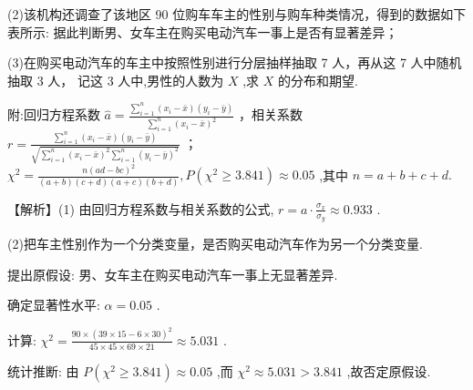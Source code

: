 \documentclass[10pt]{article}
\begin{document}
(2)该机构还调查了该地区 90 位购车车主的性别与购车种类情况，得到的数据如下表所示: 据此判断男、女车主在购买电动汽车一事上是否有显著差异；

\begin{center}
\end{center}

(3)在购买电动汽车的车主中按照性别进行分层抽样抽取 7 人，再从这 7 人中随机抽取 3 人， 记这 3 人中,男性的人数为 \(X\) ,求 \(X\) 的分布和期望.

附:回归方程系数 \(\widehat{a} = \frac{\mathop{\sum }\limits_{{i = 1}}^{n}\left( {{x}_{i} - \bar{x}}\right) \left( {{y}_{i} - \bar{y}}\right) }{\mathop{\sum }\limits_{{i = 1}}^{n}{\left( {x}_{i} - \bar{x}\right) }^{2}}\) ，相关系数 \(r = \frac{\mathop{\sum }\limits_{{i = 1}}^{n}\left( {{x}_{i} - \bar{x}}\right) \left( {{y}_{i} - \bar{y}}\right) }{\sqrt{\mathop{\sum }\limits_{{i = 1}}^{n}{\left( {x}_{i} - \bar{x}\right) }^{2}\mathop{\sum }\limits_{{i = 1}}^{n}{\left( {y}_{i} - \bar{y}\right) }^{2}}}\) ； \({\chi }^{2} = \frac{n{\left( ad - bc\right) }^{2}}{\left( {a + b}\right) \left( {c + d}\right) \left( {a + c}\right) \left( {b + d}\right) },P\left( {{\chi }^{2} \geq  {3.841}}\right)  \approx  {0.05}\) ,其中 \(n = a + b + c + d.\)

【解析】(1) 由回归方程系数与相关系数的公式, \(r = a \cdot  \frac{{\sigma }_{x}}{{\sigma }_{y}} \approx  {0.933}\) .

(2)把车主性别作为一个分类变量，是否购买电动汽车作为另一个分类变量.

提出原假设: 男、女车主在购买电动汽车一事上无显著差异.

确定显著性水平: \(\alpha  = {0.05}\) .

计算: \({\chi }^{2} = \frac{{90} \times  {\left( {39} \times  {15} - 6 \times  {30}\right) }^{2}}{{45} \times  {45} \times  {69} \times  {21}} \approx  {5.031}\) .

统计推断: 由 \(P\left( {{\chi }^{2} \geq  {3.841}}\right)  \approx  {0.05}\) ,而 \({\chi }^{2} \approx  {5.031} > {3.841}\) ,故否定原假设.
\end{document}
